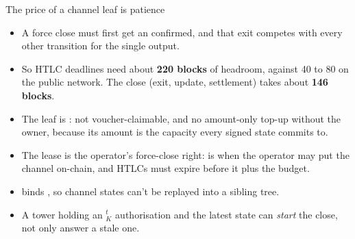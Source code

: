 \documentclass[aspectratio=169,10pt]{beamer}
\begin{document}
\begin{frame}{The price of a channel leaf is patience}
  \begin{itemize}
    \item A force close must first get an  confirmed, and that exit competes with every other transition for the single output.
    \item So HTLC deadlines need about \textbf{220 blocks} of  headroom, against 40 to 80 on the public network. The close (exit, update, settlement) takes about \textbf{146 blocks}.
    \item The leaf is : not voucher-claimable, and no amount-only top-up without the owner, because its amount is the capacity every signed state commits to.
    \item The lease is the operator's force-close right:  is when the operator may put the channel on-chain, and HTLCs must expire before it plus the budget.
    \item {} binds , so channel states can't be replayed into a sibling tree.
    \item A tower holding an $_K^t$ authorisation and the latest state can \emph{start} the close, not only answer a stale one.
  \end{itemize}
\end{frame}
\end{document}

